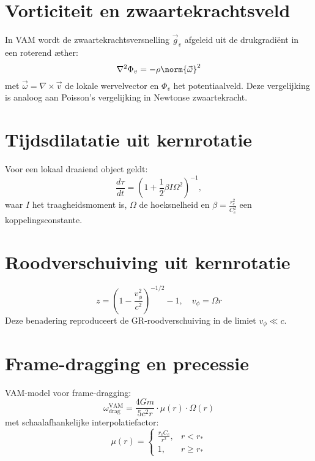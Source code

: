 
\section{Vorticiteit en zwaartekrachtsveld}
In VAM wordt de zwaartekrachtsversnelling \( \vec{g}_v \) afgeleid uit de drukgradiënt in een roterend æther:
\begin{equation}
    \nabla^2 \Phi_v = -\rho \norm{\vec{\omega}}^2
\end{equation}
met \( \vec{\omega} = \nabla \times \vec{v} \) de lokale wervelvector en \( \Phi_v \) het potentiaalveld. Deze vergelijking is analoog aan Poisson's vergelijking in Newtonse zwaartekracht.





\section{Tijdsdilatatie uit kernrotatie}
Voor een lokaal draaiend object geldt:
\begin{equation}
    \frac{d\tau}{dt} = \left(1 + \frac{1}{2} \beta I \Omega^2 \right)^{-1},
\end{equation}
waar \( I \) het traagheidsmoment is, \( \Omega \) de hoeksnelheid en \( \beta = \frac{r_c^2}{C_e^2} \) een koppelingsconstante.








\section{Roodverschuiving uit kernrotatie}
\begin{equation}
    z = \left(1 - \frac{v_\phi^2}{c^2} \right)^{-1/2} - 1, \quad v_\phi = \Omega r
\end{equation}
Deze benadering reproduceert de GR-roodverschuiving in de limiet \( v_\phi \ll c \).





\section{Frame-dragging en precessie}
VAM-model voor frame-dragging:
\begin{equation}
    \omega_{\text{drag}}^{\text{VAM}} = \frac{4 G m}{5 c^2 r} \cdot \mu(r) \cdot \Omega(r)
\end{equation}
met schaalafhankelijke interpolatiefactor:
\begin{equation}
    \mu(r) =
    \begin{cases}
        \displaystyle \frac{r_c C_e}{r^2}, & r < r_* \\
        1, & r \geq r_*
    \end{cases}
\end{equation}





